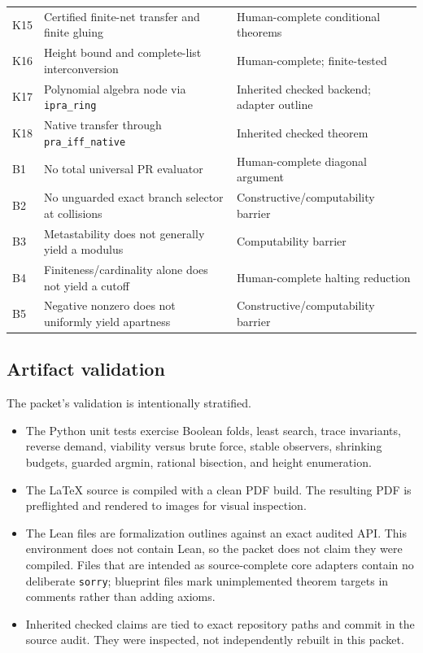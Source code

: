 \begin{longtable}{@{}p{}p{}p{}@{}}
K15 & Certified finite-net transfer and finite gluing & Human-complete conditional theorems \\
K16 & Height bound and complete-list interconversion & Human-complete; finite-tested \\
K17 & Polynomial algebra node via \texttt{ipra\_ring} & Inherited checked backend; adapter outline \\
K18 & Native transfer through \texttt{pra\_iff\_native} & Inherited checked theorem \\
B1 & No total universal PR evaluator & Human-complete diagonal argument \\
B2 & No unguarded exact branch selector at collisions & Constructive/computability barrier \\
B3 & Metastability does not generally yield a modulus & Computability barrier \\
B4 & Finiteness/cardinality alone does not yield a cutoff & Human-complete halting reduction \\
B5 & Negative nonzero does not uniformly yield apartness & Constructive/computability barrier \\
\bottomrule
\end{longtable}

\subsection{Artifact validation}

The packet's validation is intentionally stratified.
\begin{itemize}
  \item The Python unit tests exercise Boolean folds, least search, trace invariants, reverse demand, viability versus brute force, stable observers, shrinking budgets, guarded argmin, rational bisection, and height enumeration.
  \item The LaTeX source is compiled with a clean PDF build.  The resulting PDF is preflighted and rendered to images for visual inspection.
  \item The Lean files are formalization outlines against an exact audited API.  This environment does not contain Lean, so the packet does not claim they were compiled.  Files that are intended as source-complete core adapters contain no deliberate \texttt{sorry}; blueprint files mark unimplemented theorem targets in comments rather than adding axioms.
  \item Inherited checked claims are tied to exact repository paths and commit in the source audit.  They were inspected, not independently rebuilt in this packet.
\end{itemize}

